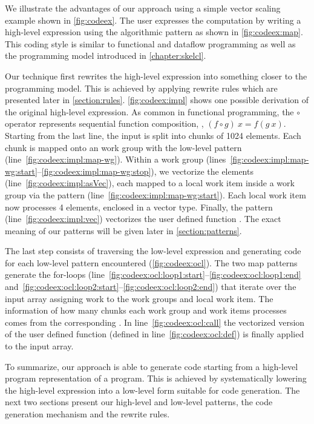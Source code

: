 We illustrate the advantages of our approach using a simple vector scaling example shown in \autoref{fig:codeex}.
The user expresses the computation by writing a high-level expression using the algorithmic  pattern as shown in \autoref{fig:codeex:map}.
This coding style is similar to functional and dataflow programming as well as the \SkelCL programming model introduced in \autoref{chapter:skelcl}.

Our technique first rewrites the high-level expression into something closer to the \OpenCL programming model.
This is achieved by applying rewrite rules which are presented later in \autoref{section:rules}.
\autoref{fig:codeex:impl} shows one possible derivation of the original high-level expression.
As common in functional programming, the $\circ$ operator represents sequential function composition, \ie, $(f \circ g)\ x = f(g\ x)$.
Starting from the last line, the input is split into chunks of 1024 elements.
Each chunk is mapped onto an \OpenCL work group with the  low-level pattern (line~\ref{fig:codeex:impl:map-wg}).
Within a work group (lines~\ref{fig:codeex:impl:map-wg:start}--\ref{fig:codeex:impl:map-wg:stop}), we vectorize the elements (line~\ref{fig:codeex:impl:asVec}), each mapped to a local work item inside a work group via the  pattern (line~\ref{fig:codeex:impl:map-wg:start}).
Each local work item now processes 4 elements, enclosed in a vector type.
Finally, the  pattern (line~\ref{fig:codeex:impl:vec}) vectorizes the user defined function .
The exact meaning of our patterns will be given later in \autoref{section:patterns}.

The last step consists of traversing the low-level expression and generating \OpenCL code for each low-level pattern encountered (\autoref{fig:codeex:ocl}).
The two map patterns generate the for-loops (line~\ref{fig:codeex:ocl:loop1:start}--\ref{fig:codeex:ocl:loop1:end} and~\ref{fig:codeex:ocl:loop2:start}--\ref{fig:codeex:ocl:loop2:end}) that iterate over the input array assigning work to the work groups and local work item.
The information of how many chunks each work group and work items processes comes from the corresponding .
In line~\ref{fig:codeex:ocl:call} the vectorized version of the user defined  function (defined in line~\ref{fig:codeex:ocl:def}) is finally applied to the input array.

To summarize, our approach is able to generate \OpenCL code starting from a high-level program representation of a program.
This is achieved by systematically lowering the high-level expression into a low-level form suitable for code generation.
The next two sections present our high-level and low-level patterns, the code generation mechanism and the rewrite rules.

